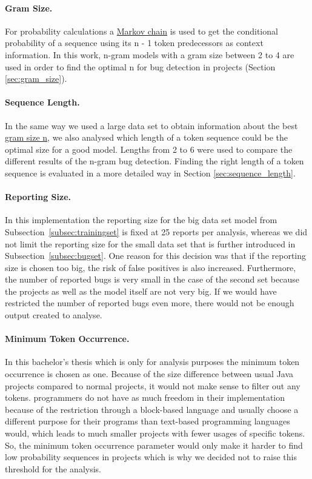 \paragraph{Gram Size.}
For probability calculations a \hyperref[def:markov_chain]{Markov chain} is used to get the conditional probability of a sequence using its n - 1 token predecessors as context information. In this work, n-gram models with a gram size between 2 to 4 are used in order to find the optimal n for bug detection in \scratch{} projects (Section \ref{sec:gram_size}). 
\paragraph{Sequence Length.}
In the same way we used a large data set to obtain information about the best \hyperref[def:gram_size]{gram size n}, we also analysed which length of a token sequence could be the optimal size for a good model. Lengths from 2 to 6 were used to compare the different results of the n-gram bug detection. Finding the right length of a token sequence is evaluated in a more detailed way in Section \ref{sec:sequence_length}.
\paragraph{Reporting Size.}
In this implementation the reporting size for the big data set model from Subsection~\ref{subsec:trainingset} is fixed at 25 reports per analysis, whereas we did not limit the reporting size for the small data set that  is further introduced in Subsection~\ref{subsec:bugset}. One reason for this decision was that if the reporting size is chosen too big, the risk of false positives is also increased. Furthermore, the number of reported bugs is very small in the case of the second set because the projects as well as the model itself are not very big. If we would have restricted the number of reported bugs even more, there would not be enough output created to analyse.  
\paragraph{Minimum Token Occurrence.}
In this bachelor's thesis \ngram{} which is only for \scratch{} analysis purposes the minimum token occurrence is chosen as one. Because of the size difference between usual Java projects compared to normal \scratch{} projects, it would not make sense to filter out any tokens. \scratch{} programmers do not have as much freedom in their implementation because of the restriction through a block-based language and usually choose a different purpose for their programs than text-based programming languages would, which leads to much smaller projects with fewer usages of specific tokens. So, the minimum token occurrence parameter would only make it harder to find low probability sequences in projects which is why we decided not to raise this threshold for the analysis.
